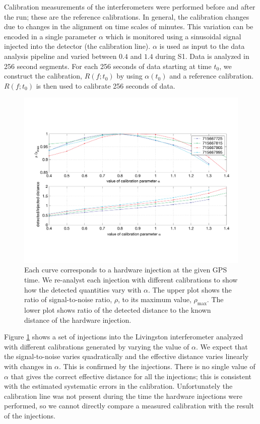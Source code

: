 Calibration measurements of the interferometers were performed before and
after the run; these are the reference calibrations. In general, the
calibration changes due to changes in the alignment on time scales of minutes.
This variation can be encoded in a single parameter $\alpha$ which is
monitored using a sinusoidal signal injected into the
detector (the calibration line)\cite{Adhikari:2003}. $\alpha$ is used as input
to the data analysis pipeline and varied between $0.4$ and $1.4$ during S1.
Data is analyzed in 256 second segments.  For each 256 seconds of data
starting at time $t_0$, we construct the calibration, $R(f;t_0)$ by using
$\alpha(t_0)$ and a reference calibration.  $R(f;t_0)$ is then used to
calibrate 256 seconds of data.

\begin{figure}[htb]
  \vspace{5pt}
  \begin{flushright}
    \includegraphics[width=\textwidth]{figures/hardware/calibration}    
  \end{flushright}
  \caption{%
  Each curve corresponds to a hardware injection at the given GPS time. We
  re-analyst each injection with different calibrations to show how the
  detected quantities vary with $\alpha$. The upper plot shows the ratio of
  signal-to-noise ratio, $\rho$, to its maximum value, $\rho_{\mathrm{max}}$.
  The lower plot shows ratio of the detected distance to the known distance of
  the hardware injection.
  }
\label{f:calibration}
\end{figure}
Figure \ref{f:calibration} shows a set of injections into the Livingston
interferometer analyzed with different calibrations generated by varying the
value of $\alpha$. We expect that the signal-to-noise varies quadratically and
the effective distance varies linearly with changes in $\alpha$\cite{Allen:1996}.
This is confirmed by the injections.  There is no single value of $\alpha$
that gives the correct effective distance for all the injections; this is
consistent with the estimated systematic errors in the calibration.
Unfortunately the calibration line was not present during the time the
hardware injections were performed, so we cannot directly compare a measured
calibration with the result of the injections.

